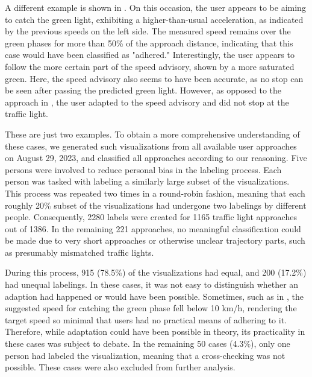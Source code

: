 A different example is shown in . On this occasion, the user appears to be aiming to catch the green light, exhibiting a higher-than-usual acceleration, as indicated by the previous speeds on the left side. The measured speed remains over the green phases for more than 50\% of the approach distance, indicating that this case would have been classified as "adhered." Interestingly, the user appears to follow the more certain part of the speed advisory, shown by a more saturated green. Here, the speed advisory also seems to have been accurate, as no stop can be seen after passing the predicted green light. However, as opposed to the approach in , the user adapted to the speed advisory and did not stop at the traffic light.

These are just two examples. To obtain a more comprehensive understanding of these cases, we generated such visualizations from all available user approaches on August 29, 2023, and classified all approaches according to our reasoning. Five persons were involved to reduce personal bias in the labeling process. Each person was tasked with labeling a similarly large subset of the visualizations. This process was repeated two times in a round-robin fashion, meaning that each roughly 20\% subset of the visualizations had undergone two labelings by different people. Consequently, 2280 labels were created for 1165 traffic light approaches out of 1386. In the remaining 221 approaches, no meaningful classification could be made due to very short approaches or otherwise unclear trajectory parts, such as presumably mismatched traffic lights. 

During this process, 915 (78.5\%) of the visualizations had equal, and 200 (17.2\%) had unequal labelings. In these cases, it was not easy to distinguish whether an adaption had happened or would have been possible. Sometimes, such as in , the suggested speed for catching the green phase fell below 10 km/h, rendering the target speed so minimal that users had no practical means of adhering to it. Therefore, while adaptation could have been possible in theory, its practicality in these cases was subject to debate. In the remaining 50 cases (4.3\%), only one person had labeled the visualization, meaning that a cross-checking was not possible. These cases were also excluded from further analysis.

